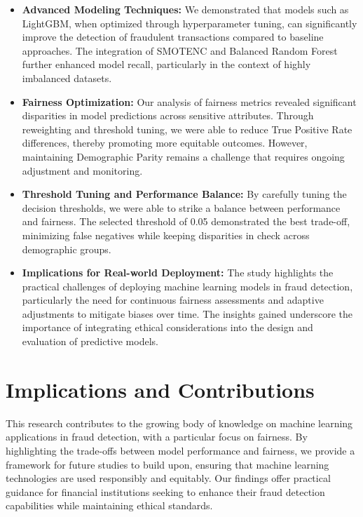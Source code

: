 \documentclass[12pt,a4paper]{report}
\begin{document}
\begin{itemize}
    \item \textbf{Advanced Modeling Techniques:} We demonstrated that models such as LightGBM, when optimized through hyperparameter tuning, can significantly improve the detection of fraudulent transactions compared to baseline approaches. The integration of SMOTENC and Balanced Random Forest further enhanced model recall, particularly in the context of highly imbalanced datasets.
    
    \item \textbf{Fairness Optimization:} Our analysis of fairness metrics revealed significant disparities in model predictions across sensitive attributes. Through reweighting and threshold tuning, we were able to reduce True Positive Rate differences, thereby promoting more equitable outcomes. However, maintaining Demographic Parity remains a challenge that requires ongoing adjustment and monitoring.
    
    \item \textbf{Threshold Tuning and Performance Balance:} By carefully tuning the decision thresholds, we were able to strike a balance between performance and fairness. The selected threshold of 0.05 demonstrated the best trade-off, minimizing false negatives while keeping disparities in check across demographic groups.
    
    \item \textbf{Implications for Real-world Deployment:} The study highlights the practical challenges of deploying machine learning models in fraud detection, particularly the need for continuous fairness assessments and adaptive adjustments to mitigate biases over time. The insights gained underscore the importance of integrating ethical considerations into the design and evaluation of predictive models.
\end{itemize}

\section{Implications and Contributions}

This research contributes to the growing body of knowledge on machine learning applications in fraud detection, with a particular focus on fairness. By highlighting the trade-offs between model performance and fairness, we provide a framework for future studies to build upon, ensuring that machine learning technologies are used responsibly and equitably. Our findings offer practical guidance for financial institutions seeking to enhance their fraud detection capabilities while maintaining ethical standards.
\end{document}
